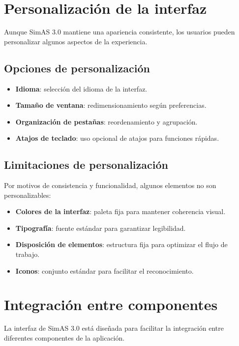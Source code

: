 \section{Personalización de la interfaz}

Aunque SimAS 3.0 mantiene una apariencia consistente, los usuarios pueden personalizar algunos aspectos de la experiencia.

\subsection{Opciones de personalización}

\begin{itemize}
    \item \textbf{Idioma}: selección del idioma de la interfaz.
    \item \textbf{Tamaño de ventana}: redimensionamiento según preferencias.
    \item \textbf{Organización de pestañas}: reordenamiento y agrupación.
    \item \textbf{Atajos de teclado}: uso opcional de atajos para funciones rápidas.
\end{itemize}

\subsection{Limitaciones de personalización}

Por motivos de consistencia y funcionalidad, algunos elementos no son personalizables:

\begin{itemize}
    \item \textbf{Colores de la interfaz}: paleta fija para mantener coherencia visual.
    \item \textbf{Tipografía}: fuente estándar para garantizar legibilidad.
    \item \textbf{Disposición de elementos}: estructura fija para optimizar el flujo de trabajo.
    \item \textbf{Iconos}: conjunto estándar para facilitar el reconocimiento.
\end{itemize}

\section{Integración entre componentes}

La interfaz de SimAS 3.0 está diseñada para facilitar la integración entre diferentes componentes de la aplicación.

